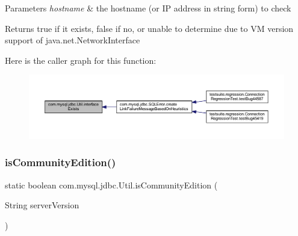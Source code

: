 \begin{DoxyParams}{Parameters}
{\em hostname} & the hostname (or IP address in string form) to check \\
\hline
\end{DoxyParams}
\begin{DoxyReturn}{Returns}
true if it exists, false if no, or unable to determine due to VM version support of java.\+net.\+Network\+Interface 
\end{DoxyReturn}
Here is the caller graph for this function\+:
\nopagebreak
\begin{figure}[H]
\begin{center}
\leavevmode
\includegraphics[width=350pt]{classcom_1_1mysql_1_1jdbc_1_1_util_a41c9a999e60af4e782a5c0eb055c7b22_icgraph}
\end{center}
\end{figure}
\mbox{\label{classcom_1_1mysql_1_1jdbc_1_1_util_ab577aaf14859ab359307da29c26bff32}} 
\subsubsection{\texorpdfstring{is\+Community\+Edition()}{isCommunityEdition()}}
{\footnotesize\ttfamily static boolean com.\+mysql.\+jdbc.\+Util.\+is\+Community\+Edition (\begin{DoxyParamCaption}\item[{String}]{server\+Version }\end{DoxyParamCaption})\hspace{0.3cm}{\ttfamily [static]}}

